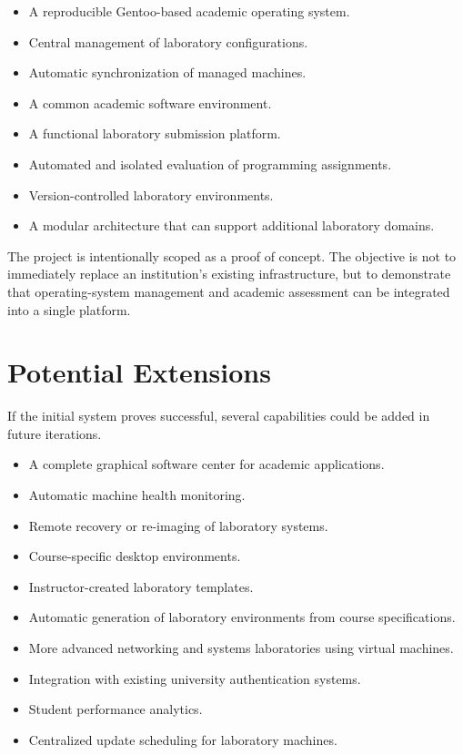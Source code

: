 \documentclass[12pt,a4paper]{article}
\begin{document}
\begin{itemize}
    \item A reproducible Gentoo-based academic operating system.
    \item Central management of laboratory configurations.
    \item Automatic synchronization of managed machines.
    \item A common academic software environment.
    \item A functional laboratory submission platform.
    \item Automated and isolated evaluation of programming assignments.
    \item Version-controlled laboratory environments.
    \item A modular architecture that can support additional laboratory domains.
\end{itemize}

The project is intentionally scoped as a proof of concept. The objective is not to immediately replace an institution's existing infrastructure, but to demonstrate that operating-system management and academic assessment can be integrated into a single platform.

\section{Potential Extensions}

If the initial system proves successful, several capabilities could be added in future iterations.

\begin{itemize}
    \item A complete graphical software center for academic applications.
    \item Automatic machine health monitoring.
    \item Remote recovery or re-imaging of laboratory systems.
    \item Course-specific desktop environments.
    \item Instructor-created laboratory templates.
    \item Automatic generation of laboratory environments from course specifications.
    \item More advanced networking and systems laboratories using virtual machines.
    \item Integration with existing university authentication systems.
    \item Student performance analytics.
    \item Centralized update scheduling for laboratory machines.
\end{itemize}
\end{document}
